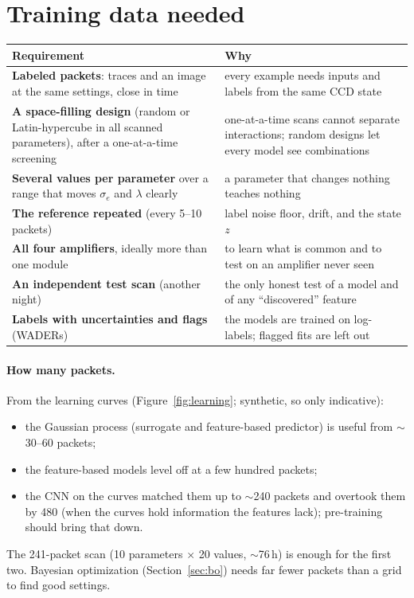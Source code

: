 \documentclass[10pt]{article}
\begin{document}
\section{Training data needed}
\label{sec:data}

\begin{table}[H]
\centering
\small
\begin{tabularx}{\textwidth}{>{\raggedright\arraybackslash}p{4.4cm}X}
\toprule
Requirement & Why \\
\midrule
\textbf{Labeled packets}: traces and an image at the same settings, close in time & every example needs inputs and labels from the same
CCD state \\
\textbf{A space-filling design} (random or Latin-hypercube in all scanned parameters), after a one-at-a-time screening & one-at-a-time
scans cannot separate interactions; random designs let every model see combinations \\
\textbf{Several values per parameter} over a range that moves $\sigma_e$ and $\lambda$ clearly & a parameter that changes nothing teaches
nothing \\
\textbf{The reference repeated} (every 5--10 packets) & label noise floor, drift, and the state $z$ \\
\textbf{All four amplifiers}, ideally more than one module & to learn what is common and to test on an amplifier never seen \\
\textbf{An independent test scan} (another night) & the only honest test of a model and of any ``discovered'' feature \\
\textbf{Labels with uncertainties and flags} (WADERs) & the models are trained on log-labels; flagged fits are left out \\
\bottomrule
\end{tabularx}
\end{table}

\paragraph{How many packets.} From the learning curves (Figure~\ref{fig:learning}; synthetic, so only indicative):
\begin{itemize}
\item the Gaussian process (surrogate and feature-based predictor) is useful from $\sim$30--60 packets;
\item the feature-based models level off at a few hundred packets;
\item the CNN on the curves matched them up to $\sim$240 packets and overtook them by 480 (when the curves hold information the features
  lack); pre-training should bring that down.
\end{itemize}
The 241-packet scan (10 parameters $\times$ 20 values, $\sim$76\,h) is enough for the first two. Bayesian optimization
(Section~\ref{sec:bo}) needs far fewer packets than a grid to find good settings.
\end{document}
